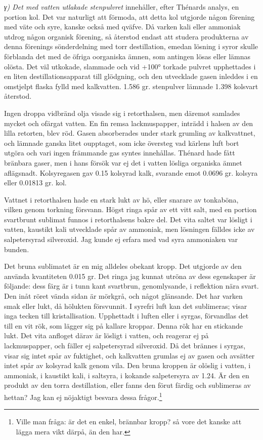 \documentclass[a4paper, 12pt, oneside, swedish]{article}
\begin{document}
\emph{γ) Det med vatten utlakade stenpulvret} innehåller, efter Thénards analys, en portion kol. Det var naturligt att förmoda, att detta kol utgjorde någon förening med väte och syre, kanske också med qväfve. Då varken kali eller ammoniak utdrog någon organisk förening, så återstod endast att studera produkterna av denna förenings sönderdelning med torr destillation, emedan lösning i syror skulle förblanda det med de öfriga oorganiska ämnen, som antingen lösas eller lämnas olösta. Det väl utkokade, slammade och vid +100° torkade pulvret upphettades i en liten destillationsapparat till glödgning, och den utvecklade gasen inleddes i en omstjelpt flaska fylld med kalkvatten. 1.586 gr. stenpulver lämnade 1.398 kolsvart återstod.

Ingen droppa vidbränd olja visade sig i retorthalsen, men däremot samlades mycket och ofärgat vatten. En fin remsa lackmuspapper, inträdd i halsen av den lilla retorten, blev röd. Gasen absorberades under stark grumling av kalkvattnet, och lämnade ganska litet oupptaget, som icke översteg vad kärlens luft bort utgöra och vari ingen främmande gas syntes innehållas. Thénard hade fått bränbara gaser, men i hans försök var ej det i vatten lösliga organiska ämnet aflägsnadt. Kolsyregasen gav 0.15 kolsyrad kalk, svarande emot 0.0696 gr. kolsyra eller 0.01813 gr. kol.

Vattnet i retorthalsen hade en stark lukt av hö, eller snarare av tonkaböna, vilken genom torkning försvann. Högst ringa spår av ett vitt salt, med en portion svartbrunt sublimat funnos i retorthalsens bakre del. Det vita saltet var lösligt i vatten, kaustikt kali utvecklade spår av ammoniak, men lösningen fälldes icke av salpetersyrad silveroxid. Jag kunde ej erfara med vad syra ammoniaken var bunden.

Det bruna sublimatet är en mig alldeles obekant kropp. Det utgjorde av den använda kvantiteten 0.015 gr. Det ringa jag kunnat utröna av dess egenskaper är följande: dess färg är i tunn kant svartbrun, genomlysande, i reflektion nära svart. Den inåt röret vända sidan är mörkgrå, och något glänsande. Det har varken smak eller lukt, då hölukten försvunnit. I syrefri luft kan det sublimeras; visar inga tecken till kristallisation. Upphettadt i luften eller i syrgas, förvandlas det till en vit rök, som lägger sig på kallare kroppar. Denna rök har en stickande lukt. Det vita anfloget därav är lösligt i vatten, och reagerar ej på lackmuspapper, och fäller ej salpetersyrad silveroxid. Då det brännes i syrgas, visar sig intet spår av fuktighet, och kalkvatten grumlas ej av gasen och avsätter intet spår av kolsyrad kalk genom vila. Den bruna kroppen är olöslig i vatten, i ammoniak, i kaustikt kali, i saltsyra, i kokande salpetersyra av 1.24. Är den en produkt av den torra destillation, eller fanns den förut färdig och sublimeras av hettan? Jag kan ej nöjaktigt besvara dessa frågor.\footnote{Ville man fråga: är det en enkel, brännbar kropp? så vore det kanske att lägga mera vikt därpå, än den har.}
\end{document}
